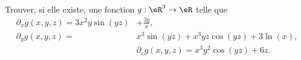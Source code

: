 \begin{exercice}\label{exodevoir2-0006}
 

Trouver, si elle existe, une fonction $g: \eR^3\to\eR$ telle que 
\begin{equation}
  \begin{aligned}
      \partial_xg(x,y,z)= 3x^2y\sin(yz)&+\frac{3y}{x}, \\
 \partial_yg(x,y,z)=& x^3\sin(yz)+x^3yz\cos(yz)+3\ln(x),\\
 & \partial_zg(x,y,z)=x^3y^2\cos(yz)+6z.
  \end{aligned}
\end{equation}

\end{exercice}
